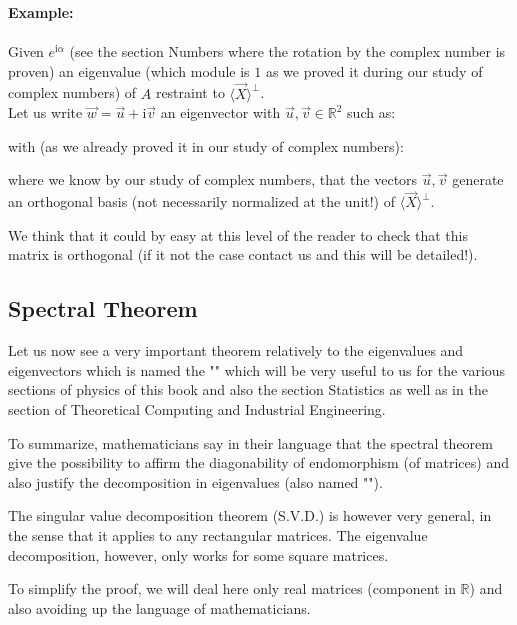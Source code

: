 	\begin{tcolorbox}[colframe=black,colback=white,sharp corners]
	\textbf{{\Large {}}Example:}\\\\
	Given $e^{\mathrm{i}\alpha}$ (see the section Numbers where the rotation by the complex number is proven) an eigenvalue (which module is $1$ as we proved it during our study of complex numbers) of $A$ restraint to $\langle \vec{X} \rangle^\perp$.\\
	
	Let us write $\vec{w}=\vec{u}+\mathrm{i}\vec{v}$ an eigenvector with $\vec{u},\vec{v}\in \mathbb{R}^2$ such as:
	
	with (as we already proved it in our study of complex numbers):
	
	where we know by our study of complex numbers, that the vectors $\vec{u},\vec{v}$ generate an orthogonal basis (not necessarily normalized at the unit!) of $\langle \vec{X} \rangle^\perp$.
	\begin{tcolorbox}[title=Remark,colframe=black,arc=10pt]
	We think that it could by easy at this level of the reader to check that this matrix is orthogonal (if it not the case contact us and this will be detailed!).
	\end{tcolorbox}
	\end{tcolorbox}
	
	\pagebreak
	\subsection{Spectral Theorem}
	Let us now see a very important theorem relatively to the eigenvalues and eigenvectors which is named the "" which will be very useful to us for the various sections of physics of this book and also the section  Statistics as well as in the section of Theoretical Computing and Industrial Engineering.
	
	To summarize, mathematicians say in their language that the spectral theorem give the possibility to affirm the diagonability of endomorphism (of matrices) and also justify the decomposition in eigenvalues (also named "").
	\begin{tcolorbox}[title=Remark,colframe=black,arc=10pt]
	The singular value decomposition theorem (S.V.D.) is however very general, in the sense that it applies to any rectangular matrices. The eigenvalue decomposition, however, only works for some square matrices.
	\end{tcolorbox}
	To simplify the proof, we will deal here only real matrices (component in $\mathbb{R }$) and also avoiding up the language of mathematicians.
	
